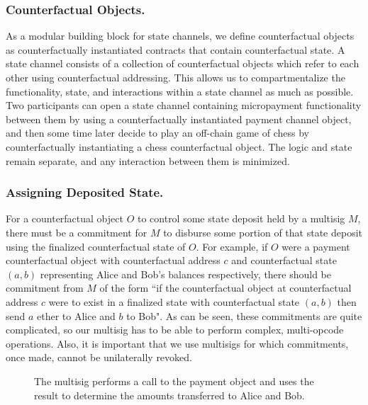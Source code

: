 \documentclass[prb,floatfix,reprint,nofootinbib,amsmath,amssymb,epsfig,pre,floats,letterpaper,groupedaffiliation,tightenlines,allcolors=blue,11pt]{revtex4}
\theoremstyle{definition}
\theoremstyle{definition}
\theoremstyle{definition}
\begin{document}
\subsubsection{Counterfactual Objects.} As a modular building block for state channels, we define counterfactual objects as counterfactually instantiated contracts that contain counterfactual state. A state channel consists of a collection of counterfactual objects which refer to each other using counterfactual addressing. This allows us to compartmentalize the functionality, state, and interactions within a state channel as much as possible. Two participants can open a state channel containing micropayment functionality between them by using a counterfactually instantiated payment channel object, and then some time later decide to play an off-chain game of chess by counterfactually instantiating a chess counterfactual object. The logic and state remain separate, and any interaction between them is minimized.

\subsubsection{Assigning Deposited State.} For a counterfactual object $O$ to control some state deposit held by a multisig $M$, there must be a commitment for $M$ to disburse some portion of that state deposit using the finalized counterfactual state of $O$. For example, if $O$ were a payment counterfactual object with counterfactual address $c$ and counterfactual state $(a, b)$ representing Alice and Bob's balances respectively, there should be commitment from $M$ of the form ``if the counterfactual object at counterfactual address $c$ were to exist in a finalized state with counterfactual state $(a, b)$ then send $a$ ether to Alice and $b$ to Bob". As can be seen, these commitments are quite complicated, so our multisig has to be able to perform complex, multi-opcode operations. Also, it is important that we use multisigs for which commitments, once made, cannot be unilaterally revoked.

\begin{figure}[H]
    \centering
    
    \caption{The multisig performs a call to the payment object and uses the result to determine the amounts transferred to Alice and Bob.}
\end{figure}
\end{document}
